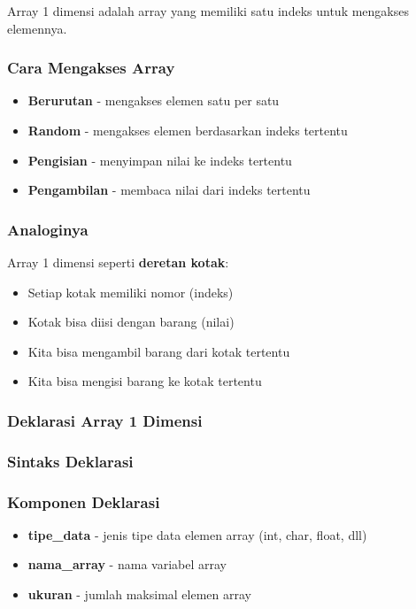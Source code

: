 Array 1 dimensi adalah array yang memiliki satu indeks untuk mengakses elemennya.

\subsubsection{Cara Mengakses Array}

\begin{itemize}
\item \textbf{Berurutan} - mengakses elemen satu per satu
\item \textbf{Random} - mengakses elemen berdasarkan indeks tertentu
\item \textbf{Pengisian} - menyimpan nilai ke indeks tertentu
\item \textbf{Pengambilan} - membaca nilai dari indeks tertentu
\end{itemize}

\subsubsection{Analoginya}

Array 1 dimensi seperti \textbf{deretan kotak}:
\begin{itemize}
\item Setiap kotak memiliki nomor (indeks)
\item Kotak bisa diisi dengan barang (nilai)
\item Kita bisa mengambil barang dari kotak tertentu
\item Kita bisa mengisi barang ke kotak tertentu
\end{itemize}

\subsubsection{Deklarasi Array 1 Dimensi}\label{deklarasi-array-satu-dimensi}

\subsubsection{Sintaks Deklarasi}



\subsubsection{Komponen Deklarasi}

\begin{itemize}
\item \textbf{tipe\_data} - jenis tipe data elemen array (int, char, float, dll)
\item \textbf{nama\_array} - nama variabel array
\item \textbf{ukuran} - jumlah maksimal elemen array
\end{itemize}

